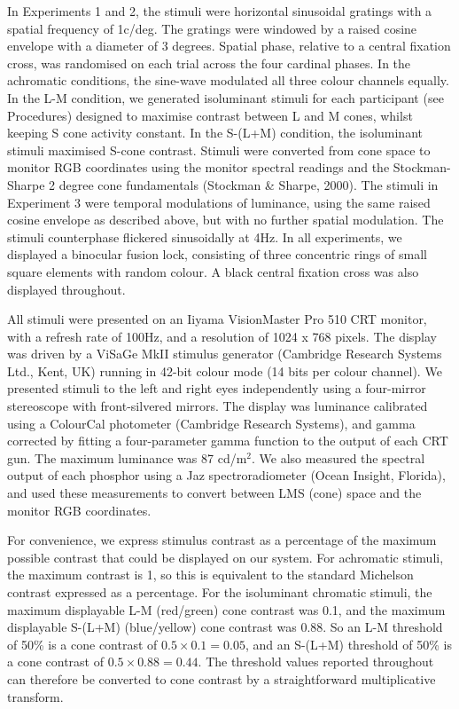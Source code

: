 \documentclass[
]{article}
\begin{document}
In Experiments 1 and 2, the stimuli were horizontal sinusoidal gratings with a spatial frequency of 1c/deg. The gratings were windowed by a raised cosine envelope with a diameter of 3 degrees. Spatial phase, relative to a central fixation cross, was randomised on each trial across the four cardinal phases. In the achromatic conditions, the sine-wave modulated all three colour channels equally. In the L-M condition, we generated isoluminant stimuli for each participant (see Procedures) designed to maximise contrast between L and M cones, whilst keeping S cone activity constant. In the S-(L+M) condition, the isoluminant stimuli maximised S-cone contrast. Stimuli were converted from cone space to monitor RGB coordinates using the monitor spectral readings and the Stockman-Sharpe 2 degree cone fundamentals (Stockman \& Sharpe, 2000). The stimuli in Experiment 3 were temporal modulations of luminance, using the same raised cosine envelope as described above, but with no further spatial modulation. The stimuli counterphase flickered sinusoidally at 4Hz. In all experiments, we displayed a binocular fusion lock, consisting of three concentric rings of small square elements with random colour. A black central fixation cross was also displayed throughout.

All stimuli were presented on an Iiyama VisionMaster Pro 510 CRT monitor, with a refresh rate of 100Hz, and a resolution of 1024 x 768 pixels. The display was driven by a ViSaGe MkII stimulus generator (Cambridge Research Systems Ltd., Kent, UK) running in 42-bit colour mode (14 bits per colour channel). We presented stimuli to the left and right eyes independently using a four-mirror stereoscope with front-silvered mirrors. The display was luminance calibrated using a ColourCal photometer (Cambridge Research Systems), and gamma corrected by fitting a four-parameter gamma function to the output of each CRT gun. The maximum luminance was 87 cd/m\(^2\). We also measured the spectral output of each phosphor using a Jaz spectroradiometer (Ocean Insight, Florida), and used these measurements to convert between LMS (cone) space and the monitor RGB coordinates.

For convenience, we express stimulus contrast as a percentage of the maximum possible contrast that could be displayed on our system. For achromatic stimuli, the maximum contrast is 1, so this is equivalent to the standard Michelson contrast expressed as a percentage. For the isoluminant chromatic stimuli, the maximum displayable L-M (red/green) cone contrast was 0.1, and the maximum displayable S-(L+M) (blue/yellow) cone contrast was 0.88. So an L-M threshold of 50\% is a cone contrast of \(0.5\times0.1 = 0.05\), and an S-(L+M) threshold of 50\% is a cone contrast of \(0.5\times0.88 = 0.44\). The threshold values reported throughout can therefore be converted to cone contrast by a straightforward multiplicative transform.
\end{document}
